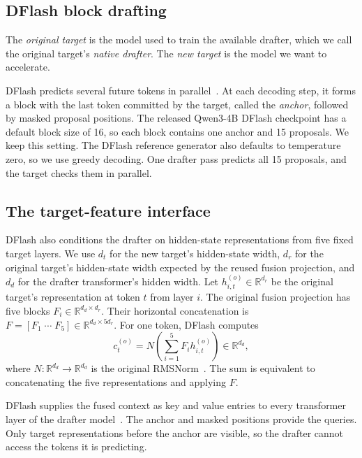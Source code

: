 \subsection{DFlash block drafting}
\label{sec:dflash-background}

The \emph{original target} is the model used to train the available drafter, which we call the original target's \emph{native drafter}. The \emph{new target} is the model we want to accelerate.

DFlash predicts several future tokens in parallel~\citep{chen2026dflash}. At each decoding step, it forms a block with the last token committed by the target, called the \emph{anchor}, followed by masked proposal positions. The released Qwen3-4B DFlash checkpoint has a default block size of 16, so each block contains one anchor and 15 proposals. We keep this setting. The DFlash reference generator also defaults to temperature zero, so we use greedy decoding. One drafter pass predicts all 15 proposals, and the target checks them in parallel.

\subsection{The target-feature interface}

DFlash also conditions the drafter on hidden-state representations from five fixed target layers. We use $d_t$ for the new target's hidden-state width, $d_r$ for the original target's hidden-state width expected by the reused fusion projection, and $d_d$ for the drafter transformer's hidden width. Let $h^{(o)}_{i,t}\in\mathbb R^{d_r}$ be the original target's representation at token $t$ from layer $i$. The original fusion projection has five blocks $F_i\in\mathbb R^{d_d\times d_r}$. Their horizontal concatenation is $F=[F_1\;\cdots\;F_5]\in\mathbb R^{d_d\times 5d_r}$. For one token, DFlash computes
\begin{equation}
 c^{(o)}_t=N\!\left(\sum_{i=1}^{5}F_i h^{(o)}_{i,t}\right)\in\mathbb R^{d_d},
 \label{eq:native-fusion}
\end{equation}
where $N:\mathbb R^{d_d}\to\mathbb R^{d_d}$ is the original RMSNorm~\citep{zhang2019rmsnorm}. The sum is equivalent to concatenating the five representations and applying $F$.

DFlash supplies the fused context as key and value entries to every transformer layer of the drafter model~\citep{chen2026dflash}. The anchor and masked positions provide the queries. Only target representations before the anchor are visible, so the drafter cannot access the tokens it is predicting.

